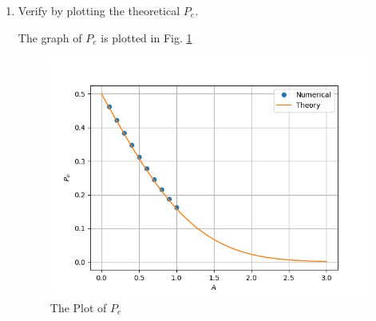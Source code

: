 \documentclass[journal,12pt,twocolumn]{IEEEtran}
\renewcommand\thesection{\arabic{section}}
\begin{document}
\begin{enumerate}[label=\thesection.\arabic*
    ,ref=\thesection.\theenumi]
Therefore, 
\begin{align}
    P_e &= P_{e|0} \times \pr{X=1} + P_{e|1} \times \pr{X=-1} \\
    &= \frac{1}{2} P_{e|0} + \frac{1}{2} P_{e|1} \\
    &= \frac{1}{2} Q_N(A) + \frac{1}{2} Q_N(A) \\
    &= Q_N(A)
\end{align}


\item
Verify by plotting  the theoretical $P_e$.  

The graph of $P_e$ is plotted in Fig. \ref{fig:errorgraph}  

\begin{figure}
    \centering
    \includegraphics[width=\columnwidth]{./figures/ErrorGraph.png}
    \caption{The Plot of $P_e$}
    \label{fig:errorgraph}
    \end{figure}

  



\end{enumerate}
\end{document}
